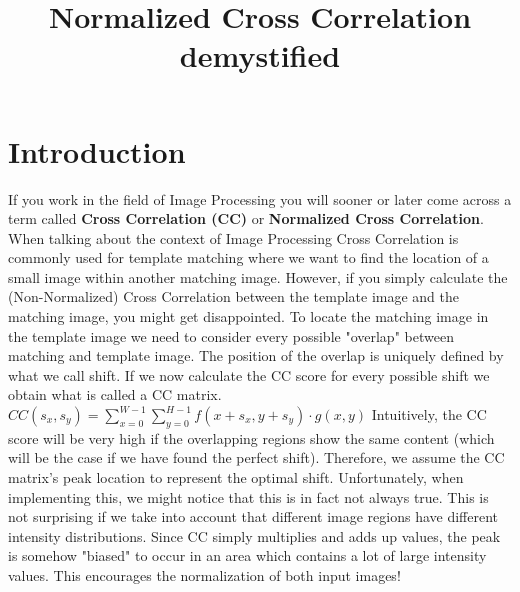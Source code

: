 \documentclass{article}
\begin{document}
\title{Normalized Cross Correlation demystified}

\maketitle

\section{Introduction}
If you work in the field of Image Processing you will sooner or later come across a term called \textbf{Cross Correlation (CC)} or \textbf{Normalized Cross Correlation}. 
\newline \newline
When talking about the context of Image Processing Cross Correlation is commonly used for template matching where we want to find the location of a small image within another matching image.
\newline \newline
However, if you simply calculate the (Non-Normalized) Cross Correlation between the template image and the matching image, you might get disappointed. To locate the matching image in the template image we need to consider every possible "overlap" between matching and template image. The position of the overlap is uniquely defined by what we call shift. If we now calculate the CC score for every possible shift we obtain what is called a CC matrix.
\newline \newline
$CC(s_x, s_y) = \sum_{x=0}^{W-1} \sum_{y=0}^{H-1} f(x+s_x,y+s_y) \cdot g(x,y)$
\newline \newline
Intuitively, the CC score will be very high if the overlapping regions show the same content (which will be the case if we have found the perfect shift). Therefore, we assume the CC matrix's peak location to represent the optimal shift.
\newline \newline
Unfortunately, when implementing this, we might notice that this is in fact not always true. This is not surprising if we take into account that different image regions have different intensity distributions. Since CC simply multiplies and adds up values, the peak is somehow "biased" to occur in an area which contains a lot of large intensity values.
\newline \newline
This encourages the normalization of both input images!
\end{document}

